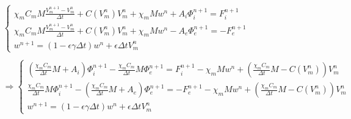 \documentclass[a4paper]{article}
\begin{document}
\begin{equation}
\begin{gathered}
\begin{cases}
\chi_m C_m M\frac{V_m^{n+1} - V_m^n}{\Delta t} + C(V_m^n)V_m^n +\chi_mMw^n + A_i \Phi_i^{n+1}= F_i^{n+1} \\
\chi_m C_m M\frac{V_m^{n+1} - V_m^n}{\Delta t} + C(V_m^n)V_m^n +\chi_mMw^n - A_e \Phi_e^{n+1}= -F_e^{n+1} \\
w^{n+1} = (1-\epsilon \gamma \Delta t) w^n + \epsilon \Delta t V_m^n
\end{cases}
\\ \\  
\Rightarrow
\begin{cases}
\left( \frac{\chi_m C_m}{\Delta t} M + A_i \right ) \Phi_i^{n+1} - \frac{\chi_m C_m}{\Delta t} M \Phi_e^{n+1} = F_i^{n+1} - \chi_m M w^n + \left( \frac{\chi_m C_m}{\Delta t} M- C(V_m^n)\right) V_m^n \\ 
\frac{\chi_m C_m}{\Delta t} M  \Phi_i^{n+1} - \left(\frac{\chi_m C_m}{\Delta t} M + A_e \right) \Phi_e^{n+1} =  -F_e^{n+1} - \chi_m M w^n + \left( \frac{\chi_m C_m}{\Delta t} M- C(V_m^n)\right) V_m^n \\
w^{n+1} = (1-\epsilon \gamma \Delta t) w^n + \epsilon \Delta tV_m^n
\end{cases}
\end{gathered} 
\end{equation}
\vspace{3mm}
\end{document}
